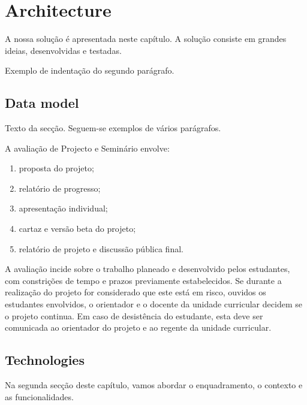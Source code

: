 \chapter{Architecture} \label{cap:architecture}

A nossa solução é apresentada neste capítulo. A solução consiste em grandes ideias, desenvolvidas e testadas.

Exemplo de indentação do segundo parágrafo.

\section{Data model} \label{sec31}
Texto da secção. Seguem-se exemplos de vários parágrafos.

A avaliação de Projecto e Seminário envolve:
\begin{enumerate}
	\item proposta do projeto;
	\item relatório de progresso;
	\item apresentação individual;
	\item cartaz e versão beta do projeto;
	\item relatório de projeto e discussão pública final.
\end{enumerate}

A avaliação incide sobre o trabalho planeado e desenvolvido pelos estudantes, com constrições de tempo e prazos previamente estabelecidos. Se durante a realização do projeto for considerado que este está em risco, ouvidos os estudantes envolvidos, o orientador e o docente da unidade curricular decidem se o projeto continua. Em caso de desistência do estudante, esta deve ser comunicada ao orientador do projeto e ao regente da unidade curricular.

\section{Technologies} \label{sec32}
Na segunda secção deste capítulo, vamos abordar o enquadramento,
o contexto e as funcionalidades.
